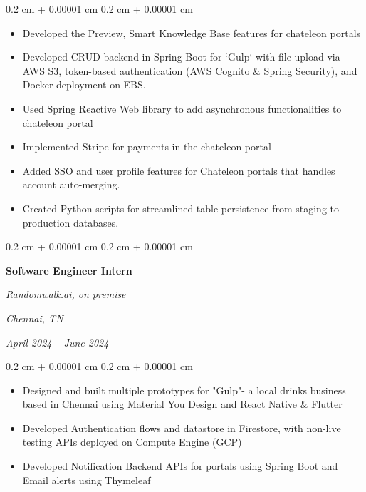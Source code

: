 \documentclass[10pt, letterpaper]{article}
\newenvironment{highlights}{
    \begin{itemize}[
        topsep=0.10 cm,
        parsep=0.10 cm,
        partopsep=0pt,
        itemsep=0pt,
        leftmargin=0.4 cm + 10pt
    ]
}{
    \end{itemize}
} %
\newenvironment{onecolentry}{
    \begin{adjustwidth}{
        0.2 cm + 0.00001 cm
    }{
        0.2 cm + 0.00001 cm
    }
}{
    \end{adjustwidth}
} %
\newenvironment{twocolentry}[2][]{
    \onecolentry
    \def\secondColumn{#2}
    \setcolumnwidth{\fill, 4.5 cm}
    \begin{paracol}{2}
}{
    \switchcolumn \raggedleft \secondColumn
    \end{paracol}
    \endonecolentry
} %
\let\hrefWithoutArrow\href
\renewcommand{\href}[2]{\hrefWithoutArrow{#1}{\ifthenelse{\equal{#2}{}}{ }{#2 }\raisebox{.15ex}{\footnotesize \faExternalLink*}}}
\begin{document}
        \vspace{0.10 cm}
\begin{onecolentry}
    \begin{highlights}
        \item Developed the Preview, Smart Knowledge Base features for chateleon portals
        \item Developed CRUD backend in Spring Boot for `Gulp` with file upload via AWS S3, token-based authentication (AWS Cognito \& Spring Security), and Docker deployment on EBS.
        \item Used Spring Reactive Web library to add asynchronous functionalities to chateleon portal
        \item Implemented Stripe for payments in the chateleon portal
        \item Added SSO and user profile features for Chateleon portals that handles account auto-merging. 
        \item Created Python scripts for streamlined table persistence from staging to production databases.
    \end{highlights}
\end{onecolentry}



        \vspace{0.2 cm}

        \begin{twocolentry}{
        \textit{Chennai, TN}    
            
        \textit{April 2024 – June 2024}}
            \textbf{Software Engineer Intern}
        
            \textit{{\hrefWithoutArrow{https://randomwalk.ai/}{\color{black}\hspace*{0.13cm}Randomwalk.ai}}, on premise}
        \end{twocolentry}

        \vspace{0.10 cm}
        \begin{onecolentry}
            \begin{highlights}
                \item Designed and built multiple prototypes for "Gulp"- a local drinks business based in Chennai using Material You Design and React Native \& Flutter
                \item Developed Authentication flows and datastore in Firestore, with non-live testing APIs deployed on Compute Engine (GCP)
                \item Developed Notification Backend APIs for \textit{\href{https://chateleon.com}{Chateleon}} portals using Spring Boot and Email alerts using Thymeleaf
            \end{highlights}
        \end{onecolentry}
\end{document}
